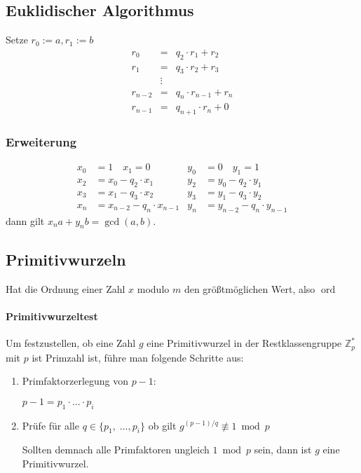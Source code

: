 \documentclass[8pt,a4paper,landscape]{article}
\newcommand{\ord}{\operatorname{ord}}
\newcommand{\Zx}[1]{\ensuremath{\mathbb{Z}_{#1}^{*}}}
\begin{document}
\begin{multicols*}{4}
  \subsection{Euklidischer Algorithmus}
  Setze $r_{0} := a, r_{1} := b$
  \begin{eqnarray*}
   r_{0} &=& q_2 \cdot r_{1} + r_{2} \\
   r_{1} &=& q_3 \cdot r_{2} + r_{3} \\
   &\vdots& \\
   r_{n-2} &=& q_{n} \cdot r_{n-1} + r_{n} \\
   r_{n-1} &=& q_{n+1} \cdot r_{n} + 0
  \end{eqnarray*}
  \subsubsection*{Erweiterung}
  {\small
  \begin{align*}
   x_{0} &= 1 \quad x_{1} = 0 & y_{0} &= 0 \quad y_{1} = 1 \\
   x_{2} &= x_{0} - q_{2} \cdot x_{1}       & y_{2} &= y_{0} - q_{2} \cdot y_{1} \\
   x_{3} &= x_{1} - q_{3} \cdot x_{2}       & y_{3} &= y_{1} - q_{3} \cdot y_{2} \\
   x_{n} &= x_{n-2} - q_{n} \cdot x_{n-1}   & y_{n} &= y_{n-2} - q_{n} \cdot y_{n-1}
  \end{align*}}
  dann gilt $x_{n}a + y_{n}b = \gcd(a,b)$.
  
  \subsection{Primitivwurzeln}
  Hat die Ordnung einer Zahl $x$ modulo $m$ den größtmöglichen Wert, also $\ord$
  
  \paragraph{Primitivwurzeltest} Um festzustellen, ob eine Zahl $g$ eine Primitivwurzel in der
  Restklassengruppe \Zx{p} mit $p$ ist Primzahl ist, führe man folgende Schritte aus:
  \begin{enumerate}
   \item Primfaktorzerlegung von $p-1$:\par
   $p-1 = p_{1} \cdot \ldots \cdot p_{i}$
   \item Prüfe für alle $q \in \{p_{1}, \;\ldots, p_{i}\}$ ob gilt
   $g^{(p-1)/q} \not\equiv 1 \bmod p$ \par
   Sollten demnach alle Primfaktoren ungleich $1 \bmod p$ sein, dann ist $g$ eine Primitivwurzel.
  \end{enumerate}
  

\end{multicols*}
\end{document}
